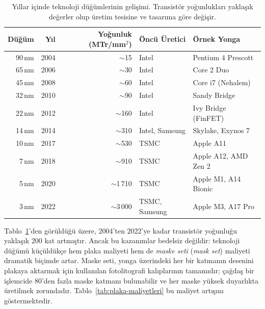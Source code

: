 \begin{table}[ht!]
\centering
\caption[Teknoloji düğümlerinin gelişimi]{Yıllar içinde teknoloji düğümlerinin gelişimi. Transistör yoğunlukları yaklaşık değerler olup üretim tesisine ve tasarıma göre değişir.}
\label{tab:teknoloji-dugumleri}
\footnotesize
\begin{tabular}{rrrll}
\toprule
\textbf{Düğüm} & \textbf{Yıl} & \textbf{Yoğunluk (MTr/mm$^2$)} & \textbf{Öncü Üretici} & \textbf{Örnek Yonga} \\
\midrule
90\,nm   & 2004 & ${\sim}$15   & Intel     & Pentium 4 Prescott \\
65\,nm   & 2006 & ${\sim}$30   & Intel     & Core 2 Duo \\
45\,nm   & 2008 & ${\sim}$60   & Intel     & Core i7 (Nehalem) \\
32\,nm   & 2010 & ${\sim}$90   & Intel     & Sandy Bridge \\
22\,nm   & 2012 & ${\sim}$160  & Intel     & Ivy Bridge (FinFET) \\
14\,nm   & 2014 & ${\sim}$310  & Intel, Samsung & Skylake, Exynos 7 \\
10\,nm   & 2017 & ${\sim}$530  & TSMC      & Apple A11 \\
7\,nm    & 2018 & ${\sim}$910  & TSMC      & Apple A12, AMD Zen 2 \\
5\,nm    & 2020 & ${\sim}$1\,710 & TSMC    & Apple M1, A14 Bionic \\
3\,nm    & 2022 & ${\sim}$3\,000 & TSMC, Samsung & Apple M3, A17 Pro \\
\bottomrule
\end{tabular}
\end{table}

Tablo~\ref{tab:teknoloji-dugumleri}'den görüldüğü üzere, 2004'ten 2022'ye kadar transistör yoğunluğu yaklaşık 200 kat artmıştır. Ancak bu kazanımlar bedelsiz değildir: teknoloji düğümü küçüldükçe hem plaka maliyeti hem de \emph{maske seti} (\emph{mask set}) maliyeti dramatik biçimde artar. Maske seti, yonga üzerindeki her bir katmanın desenini plakaya aktarmak için kullanılan fotolitografi kalıplarının tamamıdır; çağdaş bir işlemcide 80'den fazla maske katmanı bulunabilir ve her maske yüksek duyarlıkta üretilmek zorundadır. Tablo~\ref{tab:plaka-maliyetleri} bu maliyet artışını göstermektedir.

